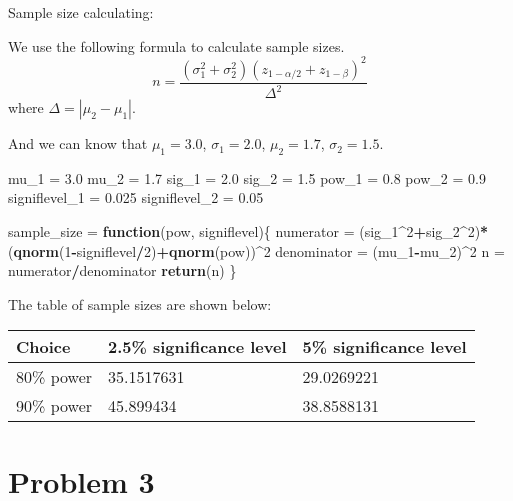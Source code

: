 \documentclass[]{article}
\newenvironment{Shaded}{\begin{snugshade}}{\end{snugshade}}
\newcommand{\KeywordTok}[1]{\textcolor[rgb]{0.13,0.29,0.53}{\textbf{#1}}}
\newcommand{\DecValTok}[1]{\textcolor[rgb]{0.00,0.00,0.81}{#1}}
\newcommand{\FloatTok}[1]{\textcolor[rgb]{0.00,0.00,0.81}{#1}}
\newcommand{\StringTok}[1]{\textcolor[rgb]{0.31,0.60,0.02}{#1}}
\newcommand{\ControlFlowTok}[1]{\textcolor[rgb]{0.13,0.29,0.53}{\textbf{#1}}}
\newcommand{\OperatorTok}[1]{\textcolor[rgb]{0.81,0.36,0.00}{\textbf{#1}}}
\newcommand{\NormalTok}[1]{#1}
\begin{document}
Sample size calculating:

We use the following formula to calculate sample sizes.
\[ n=\frac{(\sigma_1^2+\sigma_2^2)(z_{1-\alpha/2}+z_{1-\beta})^2}{\Delta^2} \]
where \(\Delta=|\mu_2-\mu_1|\).

And we can know that \(\mu_1=3.0\), \(\sigma_1=2.0\), \(\mu_2=1.7\),
\(\sigma_2=1.5\).

\begin{Shaded}
\begin{Highlighting}[]
\NormalTok{mu_}\DecValTok{1}\NormalTok{ =}\StringTok{ }\FloatTok{3.0}
\NormalTok{mu_}\DecValTok{2}\NormalTok{ =}\StringTok{ }\FloatTok{1.7}
\NormalTok{sig_}\DecValTok{1}\NormalTok{ =}\StringTok{ }\FloatTok{2.0}
\NormalTok{sig_}\DecValTok{2}\NormalTok{ =}\StringTok{ }\FloatTok{1.5}
\NormalTok{pow_}\DecValTok{1}\NormalTok{ =}\StringTok{ }\FloatTok{0.8}
\NormalTok{pow_}\DecValTok{2}\NormalTok{ =}\StringTok{ }\FloatTok{0.9}
\NormalTok{signiflevel_}\DecValTok{1}\NormalTok{ =}\StringTok{ }\FloatTok{0.025}
\NormalTok{signiflevel_}\DecValTok{2}\NormalTok{ =}\StringTok{ }\FloatTok{0.05}

\NormalTok{sample_size =}\StringTok{ }\ControlFlowTok{function}\NormalTok{(pow, signiflevel)\{}
\NormalTok{  numerator =}\StringTok{ }\NormalTok{(sig_}\DecValTok{1}\OperatorTok{^}\DecValTok{2}\OperatorTok{+}\NormalTok{sig_}\DecValTok{2}\OperatorTok{^}\DecValTok{2}\NormalTok{)}\OperatorTok{*}\NormalTok{(}\KeywordTok{qnorm}\NormalTok{(}\DecValTok{1}\OperatorTok{-}\NormalTok{signiflevel}\OperatorTok{/}\DecValTok{2}\NormalTok{)}\OperatorTok{+}\KeywordTok{qnorm}\NormalTok{(pow))}\OperatorTok{^}\DecValTok{2}
\NormalTok{  denominator =}\StringTok{ }\NormalTok{(mu_}\DecValTok{1}\OperatorTok{-}\NormalTok{mu_}\DecValTok{2}\NormalTok{)}\OperatorTok{^}\DecValTok{2}
\NormalTok{  n =}\StringTok{ }\NormalTok{numerator}\OperatorTok{/}\NormalTok{denominator}
  \KeywordTok{return}\NormalTok{(n)}
\NormalTok{\}}
\end{Highlighting}
\end{Shaded}

The table of sample sizes are shown below:

\begin{longtable}[]{@{}lll@{}}
\toprule
Choice & 2.5\% significance level & 5\% significance
level\tabularnewline
\midrule
\endhead
80\% power & 35.1517631 & 29.0269221\tabularnewline
90\% power & 45.899434 & 38.8588131\tabularnewline
\bottomrule
\end{longtable}

\section{Problem 3}\label{problem-3}
\end{document}
